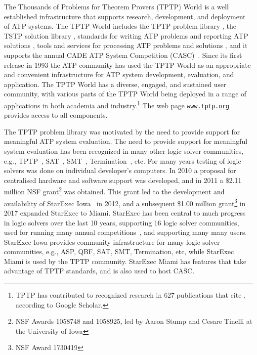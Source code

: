 \documentclass{easychair}
\begin{document}
The Thousands of Problems for Theorem Provers (TPTP) World \cite{Sut24} is a well established 
infrastructure that supports research, development, and deployment of ATP systems.
The TPTP World includes 
the TPTP problem library \cite{Sut17},
the TSTP solution library \cite{Sut10},
standards for writing ATP problems and reporting ATP solutions \cite{SS+06,Sut08-KEAPPA},
tools and services for processing ATP problems and solutions \cite{Sut10},
and it supports the annual CADE ATP System Competition (CASC)~\cite{Sut16}.
Since its first release in 1993 the ATP community has used the TPTP World as an appropriate and 
convenient infrastructure for ATP system development, evaluation, and application.
The TPTP World has a diverse, engaged, and sustained user community, with various parts of the 
TPTP World being deployed in a range of applications in both academia and industry.\footnote{%
TPTP has contributed to recognized research in 627 publications that cite \cite{Sut17},
according to Google Scholar.}
The web page \href{https://www.tptp.org}{\tt www.tptp.org} provides access to all components.

The TPTP problem library was motivated by the need to provide support for meaningful ATP system 
evaluation.
The need to provide support for meaningful system evaluation has been recognized in many other 
logic solver communities, e.g., TPTP~\cite{SS01}, SAT~\cite{HS00-SATLIB}, SMT~\cite{CSW15},
Termination~\cite{MZ07}, etc.
For many years testing of logic solvers was done on individual developer's computers. 
In 2010 a proposal for centralised hardware and software support was developed,
and in 2011 a \$2.11 million NSF grant\footnote{%
NSF Awards 1058748 and 1058925, led by Aaron Stump and Cesare Tinelli at the University of Iowa} 
was obtained.
This grant led to the development and availability of StarExec Iowa~\cite{SST14} in 2012,
and a subsequent \$1.00 million grant\footnote{%
NSF Award 1730419} in 2017 expanded StarExec to Miami.
StarExec has been central to much progress in logic solvers over the last 10 years, supporting
16 logic solver communities, used for running many annual competitions~\cite{BB+19}, and 
supporting many many users.
StarExec Iowa provides community infrastructure for many logic solver communities,
e.g., ASP, QBF, SAT, SMT, Termination, etc, while StarExec Miami is used by the TPTP community.
StarExec Miami has features that take advantage of TPTP standards, and is also used to host CASC.
\end{document}
